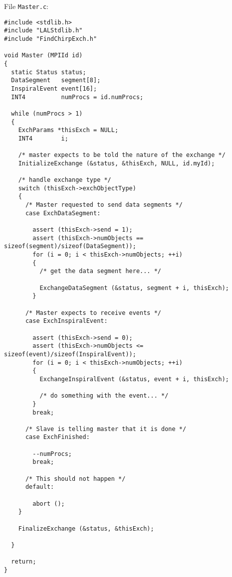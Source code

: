 \documentclass{article}
\begin{document}
File \verb+Master.c+:
\begin{verbatim}
#include <stdlib.h>
#include "LALStdlib.h"
#include "FindChirpExch.h"

void Master (MPIId id)
{
  static Status status;
  DataSegment   segment[8];
  InspiralEvent event[16];
  INT4          numProcs = id.numProcs;

  while (numProcs > 1)
  {
    ExchParams *thisExch = NULL;
    INT4        i;

    /* master expects to be told the nature of the exchange */
    InitializeExchange (&status, &thisExch, NULL, id.myId);

    /* handle exchange type */
    switch (thisExch->exchObjectType)
    {
      /* Master requested to send data segments */
      case ExchDataSegment:

        assert (thisExch->send = 1);
        assert (thisExch->numObjects == sizeof(segment)/sizeof(DataSegment));
        for (i = 0; i < thisExch->numObjects; ++i)
        {
          /* get the data segment here... */

          ExchangeDataSegment (&status, segment + i, thisExch);
        }

      /* Master expects to receive events */
      case ExchInspiralEvent:

        assert (thisExch->send = 0);
        assert (thisExch->numObjects <= sizeof(event)/sizeof(InspiralEvent));
        for (i = 0; i < thisExch->numObjects; ++i)
        {
          ExchangeInspiralEvent (&status, event + i, thisExch);

          /* do something with the event... */
        }
        break;

      /* Slave is telling master that it is done */
      case ExchFinished:

        --numProcs;
        break;

      /* This should not happen */
      default:

        abort ();
    }

    FinalizeExchange (&status, &thisExch);

  }

  return;
}
\end{verbatim}
\end{document}
